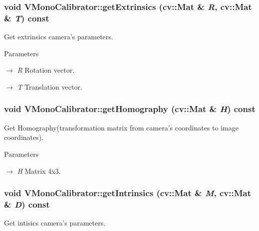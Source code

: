 \hypertarget{classVMonoCalibrator_a1a3aa1b57538d2bfd993ecf8c0b2e4fd}{
\subsubsection[{getExtrinsics}]{\setlength{\rightskip}{0pt plus 5cm}void VMonoCalibrator::getExtrinsics (cv::Mat \& {\em R}, \/  cv::Mat \& {\em T}) const}}
\label{classVMonoCalibrator_a1a3aa1b57538d2bfd993ecf8c0b2e4fd}
Get extrinsics camera's parameters. 
\begin{DoxyParams}{Parameters}
\item[\mbox{$\rightarrow$} {\em R}]Rotation vector. \item[\mbox{$\rightarrow$} {\em T}]Translation vector. \end{DoxyParams}
\hypertarget{classVMonoCalibrator_a041c63fcebcf35b1277027c0d18a7d47}{
\subsubsection[{getHomography}]{\setlength{\rightskip}{0pt plus 5cm}void VMonoCalibrator::getHomography (cv::Mat \& {\em H}) const}}
\label{classVMonoCalibrator_a041c63fcebcf35b1277027c0d18a7d47}
Get Homography(transformation matrix from camera's coordinates to image coordinates). 
\begin{DoxyParams}{Parameters}
\item[\mbox{$\rightarrow$} {\em H}]Matrix 4x3. \end{DoxyParams}
\hypertarget{classVMonoCalibrator_a0acebdd3d00dcf56a5bbb119f6572ba8}{
\subsubsection[{getIntrinsics}]{\setlength{\rightskip}{0pt plus 5cm}void VMonoCalibrator::getIntrinsics (cv::Mat \& {\em M}, \/  cv::Mat \& {\em D}) const}}
\label{classVMonoCalibrator_a0acebdd3d00dcf56a5bbb119f6572ba8}
Get intisics camera's parameters. 
